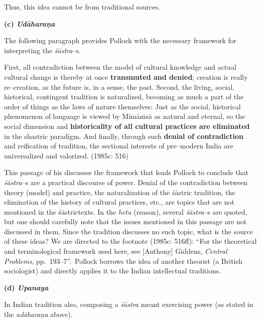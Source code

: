 Thus, this idea cannot be from traditional sources.

\textbf{(c) \textit{Udāharaṇa}}

The following paragraph provides Pollock with the necessary framework for interpreting the \textit{śāstra}–s.

\begin{myquote}
First, all contradiction between the model of cultural knowledge and actual cultural change is thereby at once \textbf{transmuted and denied}; creation is really re–creation, as the future is, in a sense, the past. Second, the living, social, historical, contingent tradition is naturalized, becoming as much a part of the order of things as the laws of nature themselves: Just as the social, historical phenomenon of language is viewed by Mīmāṁsā as natural and eternal, so the social dimension and \textbf{historicality of all cultural practices are eliminated} in the shastric paradigm. And finally, through such \textbf{denial of contradiction} and reification of tradition, the sectional interests of pre–modern India are universalized and valorized. (1985c: 516)
\end{myquote}

This passage of his discusses the framework that leads Pollock to conclude that\textit{ śāstra}–s are a practical discourse of power. Denial of the contradiction between theory (model) and practice, the naturalization of the śāstric tradition, the elimination of the history of cultural practices, etc., are topics that are not mentioned in the śāstrictexts. In the \textit{hetu} (reason), several \textit{śāstra}–s are quoted, but one should carefully note that the issues mentioned in this passage are not discussed in them. Since the tradition discusses no such topic, what is the source of these ideas? We are directed to the footnote (1985c: 516ff): “For the theoretical and terminological framework used here, see [Anthony] Giddens, \textit{Central Problems}, pp.~193–7”.~Pollock borrows the idea of another theorist (a British sociologist) and directly applies it to the Indian intellectual traditions.

\textbf{(d) \textit{Upanaya}}

In Indian tradition also, composing a \textit{śāstra} meant exercising power (as stated in the \textit{udāharaṇa} above).

